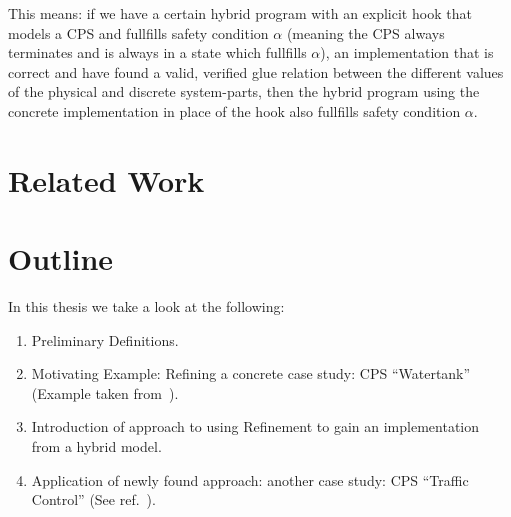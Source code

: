 This means: if we have a certain hybrid program with an explicit hook that models a CPS and fullfills safety condition \(\alpha\) (meaning the CPS always terminates and is always in a state which fullfills \(\alpha\)), an implementation that is correct and have found a valid, verified glue relation between the different values of the physical and discrete system-parts, then the hybrid program using the concrete implementation in place of the hook also fullfills safety condition \(\alpha\).


\section{Related Work}
\label{sec:related}

\section{Outline}
\label{sec:Outline}

In this thesis we take a look at the following:

\begin{enumerate}[label=\bfseries \Roman*:]

\item Preliminary Definitions.
\item Motivating Example: Refining a concrete case study: CPS ``Watertank'' (Example taken from~\cite{keymaeraGuide}).
\item Introduction of approach to using Refinement to gain an implementation from a hybrid model.
\item Application of newly found approach: another case study: CPS ``Traffic Control'' (See ref.~\cite{bla}).
\end{enumerate}